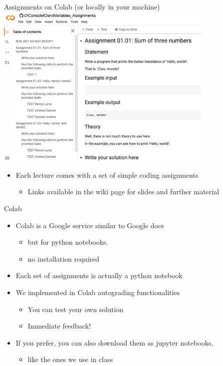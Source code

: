 \documentclass{beamer}%
\begin{document}
\begin{frame}{Assignments on Colab (or locally in your machine)}
	\centering 
	\includegraphics[width=0.78\textwidth]{figures/colab1}
	\begin{itemize}
		\item Each lecture comes with a set of simple coding assignments
		\begin{itemize}
			\item Links available in the wiki page for slides and further material
		\end{itemize}
	\end{itemize}
\end{frame}

\begin{frame}{Colab}
	\centering 
	\begin{itemize}
		\item Colab is a Google service similar to Google docs 
		\begin{itemize}
			\item but for python notebooks.
			\item no installation required
		\end{itemize}	
		\item Each set of assignments is actually a python notebook
		\item We implemented in Colab autograding functionalities
		\begin{itemize}
			\item You can test your own solution
			\item Immediate feedback!
		\end{itemize}	
		\item If you prefer, you can also download them as jupyter notebooks, 
				\begin{itemize}
			\item like the ones we use in class
			\end{itemize}
	\end{itemize}
\end{frame}
\end{document}

